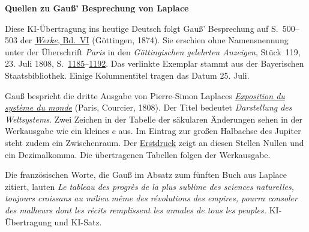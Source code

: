 \clearpage\thispagestyle{empty}
\begin{center}\textbf{Quellen zu Gauß’ Besprechung von Laplace}\end{center}
\noindent Diese KI-Übertragung ins heutige Deutsch folgt Gauß’ Besprechung auf S.~500--503 der \href{https://gdz.sub.uni-goettingen.de/id/PPN236007467}{\textit{Werke}, Bd.~VI} (Göttingen, 1874). Sie erschien ohne Namensnennung unter der Überschrift \emph{Paris} in den \textit{Göttingischen gelehrten Anzeigen}, Stück~119, 23. Juli 1808, S.~\href{https://api.digitale-sammlungen.de/iiif/image/v2/bsb10538674_00155/full/1800,/0/default.jpg}{1185}--\href{https://api.digitale-sammlungen.de/iiif/image/v2/bsb10538674_00162/full/1800,/0/default.jpg}{1192}. Das verlinkte Exemplar stammt aus der Bayerischen Staatsbibliothek. Einige Kolumnentitel tragen das Datum 25. Juli.
\par\smallskip\noindent Gauß bespricht die dritte Ausgabe von Pierre-Simon Laplaces \href{https://www.loc.gov/item/17002967/}{\textit{Exposition du système du monde}} (Paris, Courcier, 1808). Der Titel bedeutet \emph{Darstellung des Weltsystems}. Zwei Zeichen in der Tabelle der säkularen Änderungen sehen in der Werkausgabe wie ein kleines c aus. Im Eintrag zur großen Halbachse des Jupiter steht zudem ein Zwischenraum. Der \href{https://api.digitale-sammlungen.de/iiif/image/v2/bsb10538674_00159/full/1800,/0/default.jpg}{Erstdruck} zeigt an diesen Stellen Nullen und ein Dezimalkomma. Die übertragenen Tabellen folgen der Werkausgabe.
\par\smallskip\noindent Die französischen Worte, die Gauß im Absatz zum fünften Buch aus Laplace zitiert, lauten \emph{Le tableau des progrès de la plus sublime des sciences naturelles, toujours croissans au milieu même des révolutions des empires, pourra consoler des malheurs dont les récits remplissent les annales de tous les peuples.} KI-Übertragung und KI-Satz.
\clearpage
